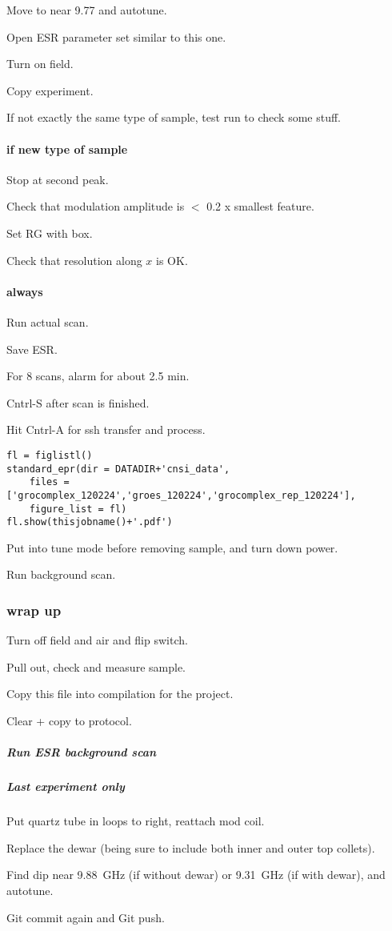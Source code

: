 Move to near 9.77 and autotune.

Open ESR parameter set similar to this one.

Turn on field.

Copy experiment.

If not exactly the same type of sample, test run to check some stuff.


\paragraph{if new type of sample}
Stop at second peak.

Check that modulation amplitude is $<$ 0.2 x smallest feature.

Set RG with box.

Check that resolution along $x$ is OK.

\paragraph{always}

Run actual scan.

Save ESR.

For 8 scans, alarm for about 2.5 min.

Cntrl-S after scan is finished.

Hit Cntrl-A for ssh transfer and process.


\begin{tiny}
\begin{lstlisting}
fl = figlistl()
standard_epr(dir = DATADIR+'cnsi_data',
    files = ['grocomplex_120224','groes_120224','grocomplex_rep_120224'],
    figure_list = fl)
fl.show(thisjobname()+'.pdf')
\end{lstlisting}
\end{tiny}

Put into tune mode before removing sample, and turn down power.

Run background scan.

\subsubsection{wrap up}
Turn off field and air and flip switch.

Pull out, check and measure sample.

Copy this file into compilation for the project.

Clear + copy to protocol.

\subparagraph{Run ESR background scan}
\subparagraph{Last experiment only}
Put quartz tube in loops to right, reattach mod coil.

Replace the dewar (being sure to include both inner and outer top collets).

Find dip near 9.88~GHz (if without dewar) or 9.31~GHz (if with dewar), and autotune.

Git commit again and Git push.


\timeblockend
